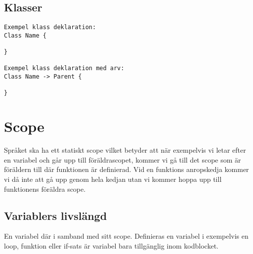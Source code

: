 \documentclass{TDP003mall}
\begin{document}
    \subsection{Klasser}
\begin{verbatim}
Exempel klass deklaration:
Class Name {
  
}

Exempel klass deklaration med arv:
Class Name -> Parent {
  
}
\end{verbatim}

    \section{Scope}
    Språket ska ha ett statiskt scope vilket betyder att när exempelvis vi letar efter en variabel och går upp till föräldrascopet, kommer vi gå till det scope som är föräldern till där funktionen är definierad. Vid en funktions anropskedja kommer vi då inte att gå upp genom hela kedjan utan vi kommer hoppa upp till funktionens föräldra scope.

    \subsection{Variablers livslängd}
    En variabel där i samband med sitt scope. Definieras en variabel i exempelvis en loop, funktion eller if-sats är variabel bara tillgänglig inom kodblocket.
 
\end{document}
